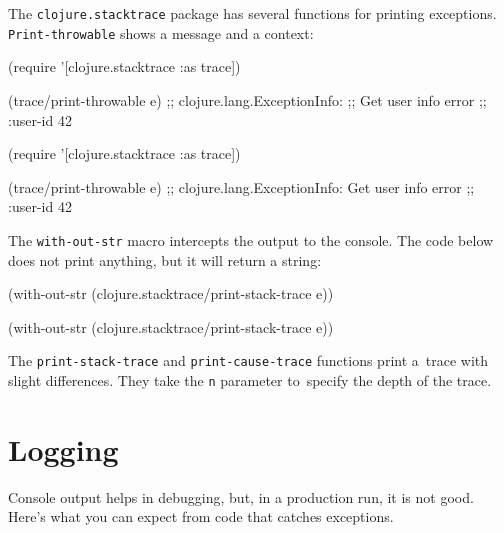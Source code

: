 
The \verb|clojure.stacktrace| package has several functions for printing exceptions. \verb|Print-throwable| shows a message and a context:

\ifnarrow

\begin{english}
  \begin{clojure}
(require '[clojure.stacktrace :as trace])

(trace/print-throwable e)
;; clojure.lang.ExceptionInfo:
;; Get user info error
;; {:user-id 42}
  \end{clojure}
\end{english}

\else

\begin{english}
  \begin{clojure}
(require '[clojure.stacktrace :as trace])

(trace/print-throwable e)
;; clojure.lang.ExceptionInfo: Get user info error
;; {:user-id 42}
  \end{clojure}
\end{english}

\fi

The \verb|with-out-str| macro intercepts the output to the console. The code below does not print anything, but it will return a string:

\ifx\DEVICETYPE\MOBILE

\begin{clojure}
(with-out-str
  (clojure.stacktrace/print-stack-trace
    e))
\end{clojure}

\else

\begin{clojure}
(with-out-str
  (clojure.stacktrace/print-stack-trace e))
\end{clojure}

\fi

The \texttt{print\--stack\--trace} and \texttt{print\--cause\--trace} functions
print a~trace with slight differences. They take the \verb|n| parameter
to~specify the depth of the trace.

\section{Logging}


Console output helps in debugging, but, in a production run, it is not good. Here's what you can expect from code that catches exceptions.

